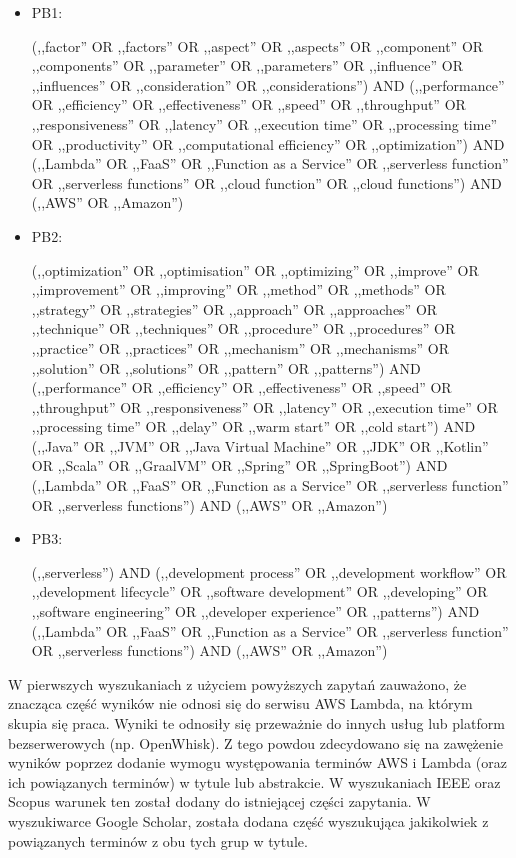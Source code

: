 \begin{itemize}
    \item PB1:

    (,,factor'' OR ,,factors'' OR ,,aspect'' OR ,,aspects'' OR ,,component'' OR ,,components'' OR ,,parameter'' OR ,,parameters'' OR ,,influence'' OR ,,influences'' OR ,,consideration'' OR ,,considerations'') 
    AND (,,performance'' OR ,,efficiency'' OR ,,effectiveness'' OR ,,speed'' OR ,,throughput'' OR ,,responsiveness'' OR ,,latency'' OR ,,execution time'' OR ,,processing time'' OR ,,productivity'' OR ,,computational efficiency'' OR ,,optimization'') 
    AND (,,Lambda'' OR ,,FaaS'' OR ,,Function as a Service'' OR ,,serverless function'' OR ,,serverless functions'' OR ,,cloud function'' OR ,,cloud functions'')
    AND (,,AWS'' OR ,,Amazon'')

    \item PB2:
    
    (,,optimization'' OR ,,optimisation'' OR ,,optimizing'' OR ,,improve'' OR ,,improvement'' OR ,,improving'' OR ,,method'' OR ,,methods'' OR ,,strategy'' OR ,,strategies'' OR ,,approach'' OR ,,approaches'' OR ,,technique'' OR ,,techniques'' OR ,,procedure'' OR ,,procedures'' OR ,,practice'' OR ,,practices'' OR ,,mechanism'' OR ,,mechanisms'' OR ,,solution'' OR ,,solutions'' OR ,,pattern'' OR ,,patterns'')
    AND (,,performance'' OR ,,efficiency'' OR ,,effectiveness'' OR ,,speed'' OR ,,throughput'' OR ,,responsiveness'' OR ,,latency'' OR ,,execution time'' OR ,,processing time'' OR ,,delay'' OR ,,warm start'' OR ,,cold start'')
    AND (,,Java'' OR ,,JVM'' OR ,,Java Virtual Machine'' OR ,,JDK'' OR ,,Kotlin'' OR ,,Scala'' OR ,,GraalVM'' OR ,,Spring'' OR ,,SpringBoot'')
    AND (,,Lambda'' OR ,,FaaS'' OR ,,Function as a Service'' OR ,,serverless function'' OR ,,serverless functions'')
    AND (,,AWS'' OR ,,Amazon'')

    \item PB3:
    
    (,,serverless'') 
    AND (,,development process'' OR ,,development workflow'' OR ,,development lifecycle'' OR ,,software development'' OR ,,developing'' OR ,,software engineering'' OR ,,developer experience'' OR ,,patterns'') 
    AND (,,Lambda'' OR ,,FaaS'' OR ,,Function as a Service'' OR ,,serverless function'' OR ,,serverless functions'') 
    AND (,,AWS'' OR ,,Amazon'')
    
\end{itemize}

W pierwszych wyszukaniach z użyciem powyższych zapytań zauważono, że znacząca część wyników nie odnosi się do serwisu AWS Lambda, na którym skupia się praca.
Wyniki te odnosiły się przeważnie do innych usług lub platform bezserwerowych (np. OpenWhisk).
Z tego powdou zdecydowano się na zawężenie wyników poprzez dodanie wymogu występowania terminów AWS i Lambda (oraz ich powiązanych terminów) w tytule lub abstrakcie.
W wyszukaniach IEEE oraz Scopus warunek ten został dodany do istniejącej części zapytania. 
W wyszukiwarce Google Scholar, została dodana część wyszukująca jakikolwiek z powiązanych terminów z obu tych grup w tytule. 

